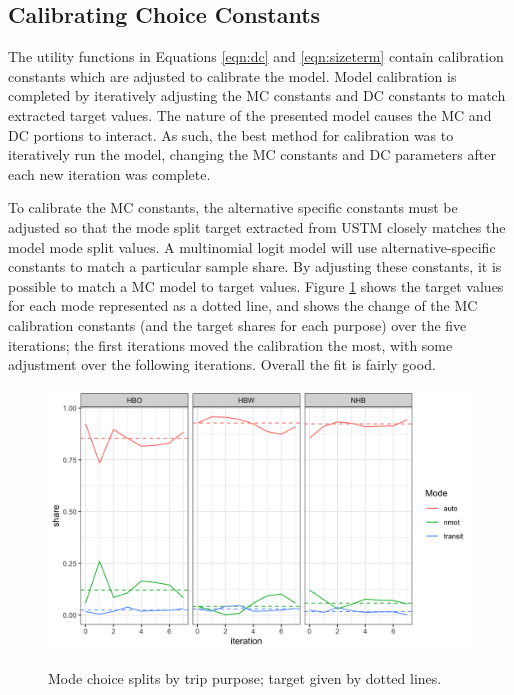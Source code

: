 \subsection{Calibrating Choice Constants}

The utility functions in Equations \ref{eqn:dc} and \ref{eqn:sizeterm} contain
calibration constants which are adjusted to calibrate the model. Model
calibration is completed by iteratively adjusting the MC
constants and DC constants to match extracted target values. The nature
of the presented model causes the MC and DC portions to interact. As such,
the best method for calibration was to iteratively run the model, changing
the MC constants and DC parameters after each new iteration was complete.

To calibrate the MC constants, the alternative specific constants must be
adjusted so that the mode split target extracted from USTM closely matches the
model mode split values. A multinomial logit model will use alternative-specific
constants to match a particular sample share. By adjusting these
constants, it is possible to match a MC model to target values.
Figure \ref{fig:nhbmc} shows the target values for each mode represented as a
dotted line, and shows the change of the MC calibration constants
(and the target shares for each purpose) over the five iterations;
the first iterations moved the calibration the most, with some adjustment
over the following iterations. Overall the fit is fairly good.

  \begin{figure}
    \centering
  {\centering \includegraphics[width=0.75\linewidth]{figures/chapter3/MC_split.png}
  }
  \caption{Mode choice splits by trip purpose; target given by dotted lines.}\label{fig:nhbmc}
  \end{figure}

